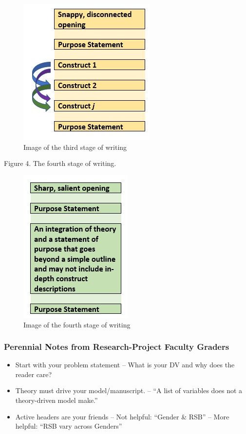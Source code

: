 \documentclass[
  english,
]{book}
\providecommand{\tightlist}{%
  \setlength{\itemsep}{0pt}\setlength{\parskip}{0pt}}
\begin{document}
\begin{figure}
\centering
\includegraphics{images/APAstyle/Stage3.jpg}
\caption{Image of the third stage of writing}
\end{figure}

Figure 4. The fourth stage of writing.

\begin{figure}
\centering
\includegraphics{images/APAstyle/Stage4.jpg}
\caption{Image of the fourth stage of writing}
\end{figure}

\hypertarget{perennial-notes-from-research-project-faculty-graders}{%
\subsubsection{Perennial Notes from Research-Project Faculty Graders}\label{perennial-notes-from-research-project-faculty-graders}}

\begin{itemize}
\tightlist
\item
  Start with your problem statement
  -- What is your DV and why does the reader care?
\item
  Theory must drive your model/manuscript.
  -- ``A list of variables does not a theory-driven model make.''
\item
  Active headers are your friends
  -- Not helpful: ``Gender \& RSB''
  -- More helpful: ``RSB vary across Genders''
\end{itemize}
\end{document}
